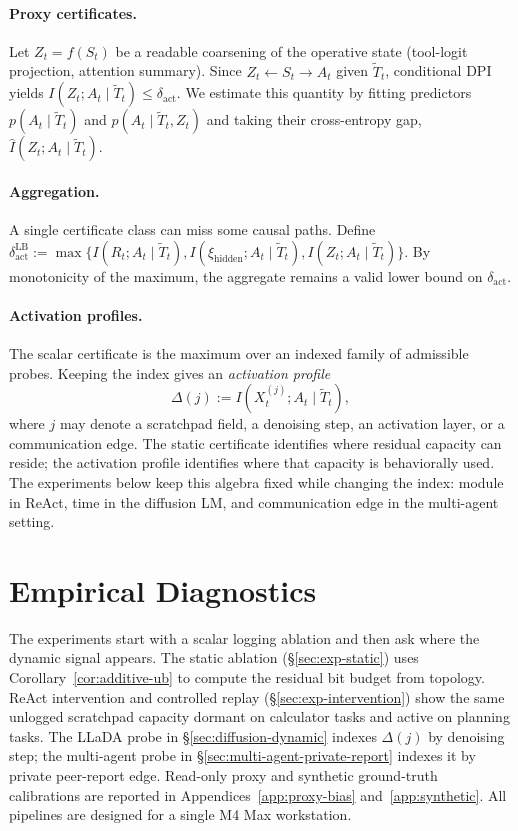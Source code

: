 \documentclass{article}
\begin{document}
\paragraph{Proxy certificates.}
Let $Z_t = f(S_t)$ be a readable coarsening of the operative state (tool-logit projection, attention summary).  Since $Z_t \leftarrow S_t \to A_t$ given $\tilde T_t$, conditional DPI yields $I(Z_t; A_t \mid \tilde T_t) \leq \delta_\text{act}$.  We estimate this quantity by fitting predictors $p(A_t \mid \tilde T_t)$ and $p(A_t \mid \tilde T_t, Z_t)$ and taking their cross-entropy gap, $\hat I(Z_t; A_t \mid \tilde T_t)$.

\paragraph{Aggregation.}
A single certificate class can miss some causal paths.  Define $\delta_\text{act}^\text{LB} := \max\{ I(R_t; A_t \mid \tilde T_t), I(\xi_\text{hidden}; A_t \mid \tilde T_t), I(Z_t; A_t \mid \tilde T_t) \}$.  By monotonicity of the maximum, the aggregate remains a valid lower bound on $\delta_\text{act}$.

\paragraph{Activation profiles.}
The scalar certificate is the maximum over an indexed family of admissible probes. Keeping the index gives an \emph{activation profile}
\[
  \Delta(j) := I(X_t^{(j)}; A_t \mid \tilde T_t),
\]
where $j$ may denote a scratchpad field, a denoising step, an activation layer, or a communication edge.  The static certificate identifies where residual capacity can reside; the activation profile identifies where that capacity is behaviorally used.  The experiments below keep this algebra fixed while changing the index: module in ReAct, time in the diffusion LM, and communication edge in the multi-agent setting.

\section{Empirical Diagnostics}
\label{sec:empirical}

The experiments start with a scalar logging ablation and then ask where the dynamic signal appears. The static ablation (\S\ref{sec:exp-static}) uses Corollary~\ref{cor:additive-ub} to compute the residual bit budget from topology. ReAct intervention and controlled replay (\S\ref{sec:exp-intervention}) show the same unlogged scratchpad capacity dormant on calculator tasks and active on planning tasks. The LLaDA probe in \S\ref{sec:diffusion-dynamic} indexes $\Delta(j)$ by denoising step; the multi-agent probe in \S\ref{sec:multi-agent-private-report} indexes it by private peer-report edge. Read-only proxy and synthetic ground-truth calibrations are reported in Appendices~\ref{app:proxy-bias} and~\ref{app:synthetic}. All pipelines are designed for a single M4 Max workstation.
\end{document}
